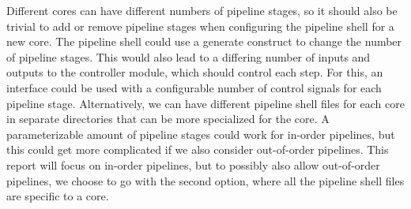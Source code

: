 Different cores can have different numbers of pipeline stages, so it should also be trivial to add or remove pipeline stages when configuring the pipeline shell for a new core. The pipeline shell could use a generate construct to change the number of pipeline stages. This would also lead to a differing number of inputs and outputs to the controller module, which should control each step. For this, an interface could be used with a configurable number of control signals for each pipeline stage. Alternatively, we can have different pipeline shell files for each core in separate directories that can be more specialized for the core. A parameterizable amount of pipeline stages could work for in-order pipelines, but this could get more complicated if we also consider out-of-order pipelines. This report will focus on in-order pipelines, but to possibly also allow out-of-order pipelines, we choose to go with the second option, where all the pipeline shell files are specific to a core.


%
%
%
%
%
%


%

